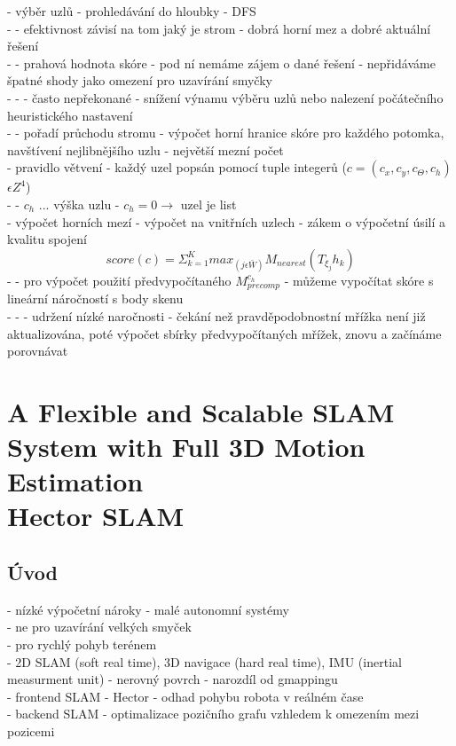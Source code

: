 \documentclass[11pt]{article}
\begin{document}
- výběr uzlů - prohledávání do hloubky - DFS\\
- - efektivnost závisí na tom jaký je strom - dobrá horní mez a dobré aktuální řešení\\
- - prahová hodnota skóre - pod ní nemáme zájem o dané řešení - nepřidáváme špatné shody jako omezení pro uzavírání smyčky\\
- - - často nepřekonané - snížení výnamu výběru uzlů nebo nalezení počátečního heuristického nastavení\\
- - pořadí průchodu stromu - výpočet horní hranice skóre pro každého potomka, navštívení nejlibnějšího uzlu - největší mezní počet\\
- pravidlo větvení - každý uzel popsán pomocí tuple integerů ($c=(c_x,c_y,c_\Theta,c_h)$ $\epsilon Z^4$)\\
- - $c_h$ ... výška uzlu - $c_h=0 \rightarrow$ uzel je list\\
- výpočet horních mezí - výpočet na vnitřních uzlech - zákem o výpočetní úsilí a kvalitu spojení\\
$$score(c)=\Sigma_{k=1}^Kmax_{(j\epsilon \bar{W})}M_{nearest}(T_{\xi_j}h_k)$$
- - pro výpočet použití předvypočítaného $M_{precomp}^{c_h}$ - můžeme vypočítat skóre s lineární náročností s body skenu\\
- - - udržení nízké naročnosti - čekání než pravděpodobnostní mřížka není již aktualizována, poté výpočet sbírky předvypočítaných mřížek, znovu a začínáme porovnávat\\

\section{A Flexible and Scalable SLAM System with Full 3D Motion Estimation \\ Hector SLAM}

\subsection{Úvod}
- nízké výpočetní nároky - malé autonomní systémy\\
- ne pro uzavírání velkých smyček\\
- pro rychlý pohyb terénem\\
- 2D SLAM (soft real time), 3D navigace (hard real time), IMU (inertial measurment unit) - nerovný povrch - narozdíl od gmappingu\\
- frontend SLAM - Hector - odhad pohybu robota v reálném čase\\
- backend SLAM - optimalizace pozičního grafu vzhledem k omezením mezi pozicemi\\
\end{document}
